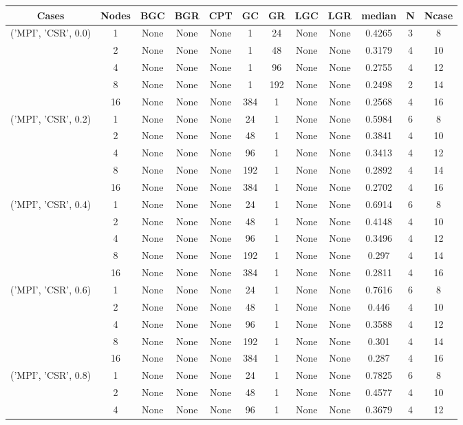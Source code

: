 \begin{tabular}{cccccccccccc}
\hline
Cases & Nodes& BGC& BGR& CPT& GC& GR& LGC& LGR& median & N & Ncase \\
\hline
\multirow{5}{*}{('MPI', 'CSR', 0.0)}& 1& None& None& None& 1& 24& None& None& 0.4265& 3& 8\\
& 2& None& None& None& 1& 48& None& None& 0.3179& 4& 10\\
& 4& None& None& None& 1& 96& None& None& 0.2755& 4& 12\\
& 8& None& None& None& 1& 192& None& None& 0.2498& 2& 14\\
& 16& None& None& None& 384& 1& None& None& 0.2568& 4& 16\\
\hline
\multirow{5}{*}{('MPI', 'CSR', 0.2)}& 1& None& None& None& 24& 1& None& None& 0.5984& 6& 8\\
& 2& None& None& None& 48& 1& None& None& 0.3841& 4& 10\\
& 4& None& None& None& 96& 1& None& None& 0.3413& 4& 12\\
& 8& None& None& None& 192& 1& None& None& 0.2892& 4& 14\\
& 16& None& None& None& 384& 1& None& None& 0.2702& 4& 16\\
\hline
\multirow{5}{*}{('MPI', 'CSR', 0.4)}& 1& None& None& None& 24& 1& None& None& 0.6914& 6& 8\\
& 2& None& None& None& 48& 1& None& None& 0.4148& 4& 10\\
& 4& None& None& None& 96& 1& None& None& 0.3496& 4& 12\\
& 8& None& None& None& 192& 1& None& None& 0.297& 4& 14\\
& 16& None& None& None& 384& 1& None& None& 0.2811& 4& 16\\
\hline
\multirow{5}{*}{('MPI', 'CSR', 0.6)}& 1& None& None& None& 24& 1& None& None& 0.7616& 6& 8\\
& 2& None& None& None& 48& 1& None& None& 0.446& 4& 10\\
& 4& None& None& None& 96& 1& None& None& 0.3588& 4& 12\\
& 8& None& None& None& 192& 1& None& None& 0.301& 4& 14\\
& 16& None& None& None& 384& 1& None& None& 0.287& 4& 16\\
\hline
\multirow{5}{*}{('MPI', 'CSR', 0.8)}& 1& None& None& None& 24& 1& None& None& 0.7825& 6& 8\\
& 2& None& None& None& 48& 1& None& None& 0.4577& 4& 10\\
& 4& None& None& None& 96& 1& None& None& 0.3679& 4& 12\\

\end{tabular}
